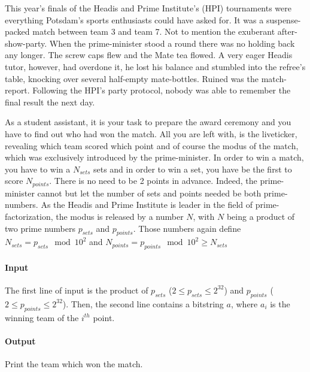 



\makeheader

This year's finals of the Headis and Prime Institute's (HPI) tournaments were everything Potsdam's sports enthusiasts could have asked for.
It was a suspense-packed match between team 3 and team 7.
Not to mention the exuberant after-show-party.
When the prime-minister stood a round there was no holding back any longer.
The screw caps flew and the Mate tea flowed.
A very eager Headis tutor, however, had overdone it, he lost his balance and stumbled into the refree's table, knocking over several half-empty mate-bottles.
Ruined was the match-report.
Following the HPI's party protocol, nobody was able to remember the final result the next day.

As a student assistant, it is your task to prepare the award ceremony and you have to find out who had won the match.
All you are left with, is the liveticker, revealing which team scored which point and of course the modus of the match,
which was exclusively introduced by the prime-minister.
In order to win a match, you have to win a $N_{sets}$ sets and in order to win a set, you have be the first to score $N_{points}$.
There is no need to be 2 points in advance.
Indeed, the prime-minister cannot but let the number of sets and points needed be both prime-numbers.
As the Headis and Prime Institute is leader in the field of prime-factorization, the modus is released by a number $N$,
with $N$ being a product of two prime numbers $p_{sets}$ and $p_{points}$. Those numbers again define $N_{sets} =
p_{sets} \mod 10^{2}$ and $N_{points} = p_{points} \mod 10^{2} \geq N_{sets}$

\paragraph*{Input}

The first line of input is the product of $p_{sets}$ ($2\leq p_{sets} \leq 2^{32}$) and $p_{points}$ ($2 \leq p_{points}
\leq 2^{32}$).
Then, the second line contains a bitstring $a$, where $a_i$ is the winning team of the $i^{th}$ point.

\paragraph*{Output}

Print the team which won the match.


\begin{samples}
\end{samples}


